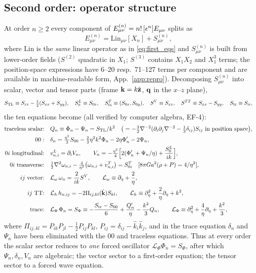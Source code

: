 \subsection{Second order: operator structure}
\label{sec:second}
At order $n\ge2$ every component of $E^{(n)}_{\mu\nu}=n!\,[\epsilon^n]E_{\mu\nu}$ splits as
\begin{equation}
E^{(n)}_{\mu\nu}=\mathrm{Lin}_{\mu\nu}[X_n]+S^{(n)}_{\mu\nu},
\label{eq:split}
\end{equation}
where $\mathrm{Lin}$ is the \emph{same} linear operator as in \eqref{eq:first_eqs} and $S^{(n)}_{\mu\nu}$ is built from
lower-order fields ($S^{(2)}$ quadratic in $X_1$; $S^{(3)}$ contains $X_1X_2$ and $X_1^3$ terms; the position-space
expressions have 6--20 resp.\ 71--127 terms per component and are available in machine-readable form, App.~\ref{app:repro}).  Decomposing
$S^{(n)}_{\mu\nu}$ into scalar, vector and tensor parts (frame $\mathbf k=k\hat{\mathbf z}$, $\mathbf q$ in the $x$--$z$ plane),
\begin{equation}
S_{\rm TL}\equiv S_{zz}-\tfrac12(S_{xx}+S_{yy}),\quad S_0^L\equiv S_{0z},\quad S^T_{0i}\equiv(S_{0x},S_{0y}),\quad
S^V\equiv S_{xz},\quad S^{TT}\equiv S_{xx}-S_{yy},\quad S_{\rm tr}\equiv S_{ii},
\label{eq:sources}
\end{equation}
the ten equations become (all verified by computer algebra, EF-4):
\begin{align}
\text{traceless scalar:}&\quad Q_n\equiv\Phi_n-\Psi_n=S_{\rm TL}/k^2
\quad\big(=-\tfrac32\ilap(\partial_i\partial_j\ilap-\tfrac13\delta_{ij})S_{ij}\ \text{in position space}\big),\nonumber\\
00:&\quad \delta_n=\tfrac{\eta^2}3S_{00}-\tfrac23\eta^2k^2\Phi_n-2\eta\Phi_n'-2\Psi_n,\nonumber\\
0i\ \text{longitudinal:}&\quad v_{n,i}^L=\partial_iV_n,\qquad V_n=-\tfrac{\eta^2}4\Big[2(\Phi_n'+\Psi_n/\eta)+\frac{S_0^L}{ik}\Big],\nonumber\\
0i\ \text{transverse:}&\quad \tfrac12\lap\omega_{n,i}-\tfrac4{\eta^2}\big(\omega_{n,i}+v^T_{n,i}\big)=S^T_{0i}
\quad[8\pi Ga^2(\rho+P)=4/\eta^2],\nonumber\\
ij\ \text{vector:}&\quad \mathcal L_\omega\,\omega_{n}=\frac2{ik}S^V,\qquad \mathcal L_\omega\equiv\partial_\eta+\frac2\eta,\nonumber\\
ij\ \text{TT:}&\quad \mathcal L_h\,h_{n,ij}=-2\Pi_{ij,kl}(\khat)S_{kl},\qquad \mathcal L_h\equiv\partial_\eta^2+\frac2\eta\partial_\eta+k^2,\nonumber\\
\text{trace:}&\quad \mathcal L_\Phi\,\Phi_n=S_\Phi\equiv-\frac{S_{\rm tr}-S_{00}}6+\frac{Q_n'}\eta-\frac{k^2}3Q_n,\qquad
\mathcal L_\Phi\equiv\partial_\eta^2+\frac4\eta\partial_\eta+\frac{k^2}3 ,
\label{eq:operators}
\end{align}
where $\Pi_{ij,kl}=P_{ik}P_{jl}-\tfrac12P_{ij}P_{kl}$, $P_{ij}=\delta_{ij}-\hat k_i\hat k_j$, and in the trace
equation $\delta_n$ and $\Psi_n$ have been eliminated with the 00 and traceless equations.  Thus at every
order the scalar sector reduces to \emph{one} forced oscillator $\mathcal L_\Phi\Phi_n=S_\Phi$, after which
$\Psi_n,\delta_n,V_n$ are algebraic; the vector sector to a first-order equation; the tensor sector to a
forced wave equation.

